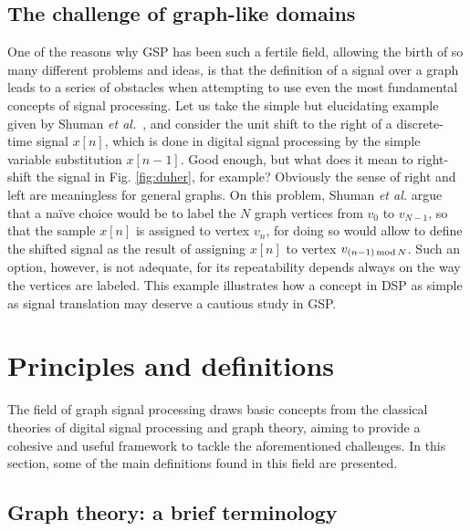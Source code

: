 \subsection{The challenge of graph-like domains}

One of the reasons why GSP has been such a fertile field, allowing the birth of so many different problems and ideas, is that the definition of a signal over a graph leads to a series of obstacles when attempting to use even the most fundamental concepts of signal processing. Let us take the simple but elucidating example given by Shuman \emph{et al.}~\cite{shuman2013emerging}, and consider the unit shift to the right of a discrete-time signal $ x[n] $, which is done in digital signal processing by the simple variable substitution $ x[n-1] $. Good enough, but what does it mean to right-shift the signal in  Fig. \ref{fig:duher}, for example? Obviously the sense of right and left are meaningless for general graphs. On this problem, Shuman \emph{et al.} argue that a na\"ive choice would be to label the $ N $ graph vertices from $ v_0 $ to $ v_{N-1} $, so that the sample $ x[n] $ is assigned to vertex $ v_n $, for doing so would allow to define the shifted signal as the result of assigning $ x[n] $ to vertex $ v_{(n-1) \text{\,mod\,} N} $. Such an option, however, is not adequate, for its repeatability depends always on the way the vertices are labeled. This example illustrates how a concept in DSP as simple as signal translation may deserve a cautious study in GSP.


\section{Principles and definitions}
\label{sec:II}
The field of graph signal processing draws basic concepts from the classical theories of digital signal processing and graph theory, aiming to provide a cohesive and useful framework to tackle the aforementioned challenges. In this section, some of the main definitions found in this field are presented.


\subsection{Graph theory: a brief terminology}

